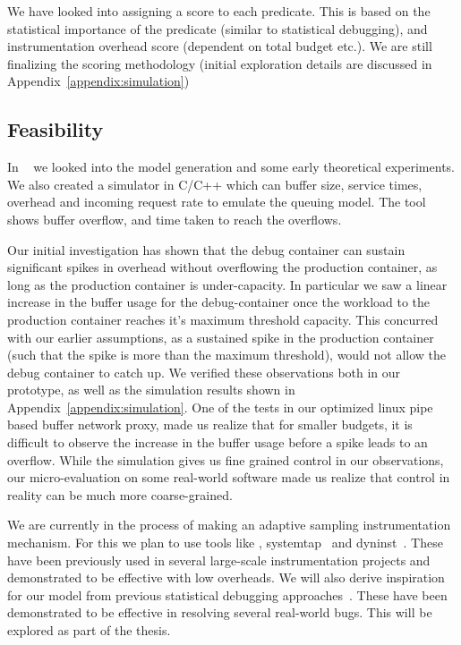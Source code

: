 We have looked into assigning a score to each predicate. This is based on the statistical importance of the predicate (similar to statistical debugging), and instrumentation overhead score (dependent on total budget etc.). We are still finalizing the scoring methodology (initial exploration details are discussed in Appendix~\ref{appendix:simulation})

\subsection{Feasibility}
\label{sec:queue_feasability}

In ~\cite{parikshanTR,parikshanQueue} we looked into the model generation and some early theoretical experiments.
We also created a simulator in C/C++ which can buffer size, service times, overhead and incoming request rate to emulate the queuing model.
The tool shows buffer overflow, and time taken to reach the overflows.

Our initial investigation has shown that the debug container can sustain significant spikes in overhead without overflowing the production container, as long as the production container is under-capacity. 
In particular we saw a linear increase in the buffer usage for the debug-container once the workload to the production container reaches it's maximum threshold capacity.
This concurred with our earlier assumptions, as a sustained spike in the production container (such that the spike is more than the maximum threshold), would not allow the debug container to catch up.
We verified these observations both in our \parikshan prototype, as well as the simulation results shown in Appendix~\ref{appendix:simulation}.
One of the tests in our optimized linux pipe based buffer network proxy, made us realize that for smaller budgets, it is difficult to observe the increase in the buffer usage before a spike leads to an overflow.
While the simulation gives us fine grained control in our observations, our micro-evaluation on some real-world software made us realize that control in reality can be much more coarse-grained.

We are currently in the process of making an adaptive sampling instrumentation mechanism. 
For this we plan to use tools like \iprobe, systemtap~\cite{systemtap} and dyninst~\cite{dyninst}. These have been previously used in several large-scale instrumentation projects and demonstrated to be effective with low overheads. We will also derive inspiration for our model from previous statistical debugging approaches~\cite{statistical-performance}. These have been demonstrated to be effective in resolving several real-world bugs. This will be explored as part of the thesis.


